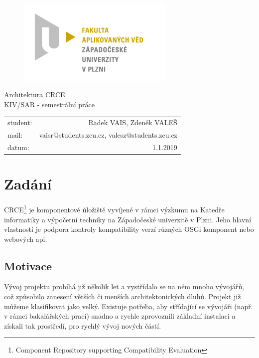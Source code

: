 \documentclass[12pt, a4paper]{article}
\begin{document}
\begin{figure}[h!]
\centering
\includegraphics[bb= 0 0 820 445 , width=75mm]{favlogo.jpg}
\end{figure}

\vspace{5cm}

{\centering
{\huge Architektura CRCE}\\[1em]
{\large KIV/SAR - semestrální práce}\\[7,5cm]
}

\begin{tabular}{l r}
student: & Radek VAIS, Zdeněk VALEŠ\\
mail: & vaisr@students.zcu.cz, valesz@students.zcu.cz\\
datum: & 1.1.2019\\
\end{tabular}

\thispagestyle{empty}
\newpage

\section{Zadání} %

CRCE\footnote{Component Repository supporting Compatibility Evaluation} je komponentové úložiště vyvíjené v rámci výzkumu na Katedře informatiky a výpočetní techniky na Západočeské univerzitě v Plzni. Jeho hlavní vlastností je podpora kontroly kompatibility verzí různých OSGi komponent nebo webových api.

\subsection{Motivace}

Vývoj projektu probíhá již několik let a vystřídalo se na něm mnoho vývojářů, což způsobilo zanesení větších či menších architektonických dluhů. Projekt již můžeme klasifikovat jako velký. Existuje potřeba, aby střídající se vývojáři (např. v rámci bakalářských prací) snadno a rychle zprovoznili základní instalaci a získali tak prostředí, pro rychlý vývoj nových částí. 
\end{document}
